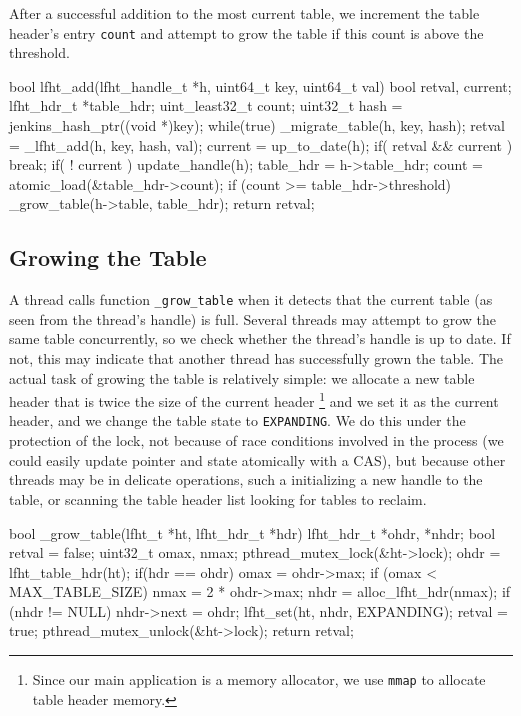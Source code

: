 After a successful addition to the most current table, we increment the
table header's entry \texttt{count} and attempt to grow the table if
this count is above the threshold.

\begin{center}
\begin{clisting}
bool lfht_add(lfht_handle_t *h, uint64_t key, uint64_t val){
  bool retval, current;
  lfht_hdr_t *table_hdr;
  uint_least32_t count;
  uint32_t hash = jenkins_hash_ptr((void *)key);
  while(true){
    _migrate_table(h, key, hash);
    retval = _lfht_add(h, key, hash, val);
    current = up\_to_date(h);
    if( retval && current ){ break; }
    if( ! current ){ update_handle(h); }
  }
  table_hdr = h->table_hdr;
  count = atomic_load(&table_hdr->count);
  if (count >= table_hdr->threshold){
    _grow_table(h->table, table_hdr);
  }
  return retval;
}

\end{clisting}
\end{center}


\subsection{Growing the Table}

A thread calls function \texttt{\_grow\_table} when it detects that
the current table (as seen from the thread's handle) is full. Several
threads may attempt to grow the same table concurrently, so we check
whether the thread's handle is up to date. If not, this may indicate
that another thread has successfully grown the table.
The actual task of growing the table is relatively simple:  we allocate
a new table header that is twice the size of the current header 
\footnote{Since our main application is a memory allocator, we use
  \texttt{mmap} to allocate table header memory.}  and we set it as
the current header, and we change the table state to
\texttt{EXPANDING}.  We do this under the protection of the lock, not
because of race conditions involved in the process (we
could easily update pointer and state atomically with a CAS), but because other
threads may be in delicate operations, such a initializing a new
handle to the table, or scanning the table header list looking
for tables to reclaim.


\begin{center}
\begin{clisting}
bool _grow_table(lfht_t *ht,  lfht_hdr_t *hdr){
  lfht_hdr_t *ohdr, *nhdr;
  bool retval = false;
  uint32_t omax, nmax;
  pthread_mutex_lock(&ht->lock);
  ohdr = lfht_table_hdr(ht);
  if(hdr == ohdr){
    omax = ohdr->max;
    if (omax < MAX_TABLE_SIZE) {
      nmax = 2 * ohdr->max;
      nhdr  = alloc_lfht_hdr(nmax);
      if (nhdr != NULL){
	nhdr->next = ohdr;
	lfht_set(ht, nhdr, EXPANDING);
	retval = true;
      }
    }
  }
  pthread_mutex_unlock(&ht->lock);
  return retval;
}

\end{clisting}
\end{center}


